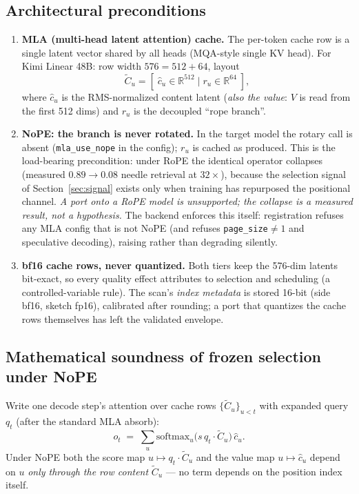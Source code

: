 \documentclass[11pt]{article}
\begin{document}
\subsection{Architectural preconditions}
\begin{enumerate}[itemsep=1pt]
\item \textbf{MLA (multi-head latent attention) cache.} The per-token cache
row is a single latent vector shared by all heads (MQA-style single KV
head). For Kimi Linear 48B: row width $576 = 512 + 64$, layout
\[
\tilde C_u = [\; \hat c_u \in \mathbb{R}^{512} \;|\; r_u \in \mathbb{R}^{64} \;],
\]
where $\hat c_u$ is the RMS-normalized content latent (\emph{also the value}:
$V$ is read from the first 512 dims) and $r_u$ is the decoupled
``rope branch''.
\item \textbf{NoPE: the branch is never rotated.} In the target model the
rotary call is absent (\texttt{mla\_use\_nope} in the config); $r_u$ is
cached as produced. This is the load-bearing precondition: under RoPE the
identical operator collapses (measured $0.89 \to 0.08$ needle retrieval at
$32\times$), because the selection signal of Section~\ref{sec:signal} exists
only when training has repurposed the positional channel. \emph{A port onto
a RoPE model is unsupported; the collapse is a measured result, not a
hypothesis.} The backend enforces this itself: registration refuses any MLA
config that is not NoPE (and refuses \texttt{page\_size}${\neq}1$ and
speculative decoding), raising rather than degrading silently.
\item \textbf{bf16 cache rows, never quantized.} Both tiers keep the
576-dim latents bit-exact, so every quality effect attributes to selection
and scheduling (a controlled-variable rule). The scan's \emph{index
metadata} is stored 16-bit (side bf16, sketch fp16), calibrated after
rounding; a port that quantizes the cache rows themselves has left the
validated envelope.
\end{enumerate}

\subsection{Mathematical soundness of frozen selection under NoPE}
\label{sec:nope-math}
Write one decode step's attention over cache rows $\{\tilde C_u\}_{u<t}$ with
expanded query $q_t$ (after the standard MLA absorb):
\[
o_t \;=\; \sum_{u} \mathrm{softmax}_u\!\big( s\, q_t \cdot \tilde C_u \big)\, \hat c_u .
\]
Under NoPE both the score map $u \mapsto q_t \cdot \tilde C_u$ and the value
map $u \mapsto \hat c_u$ depend on $u$ \emph{only through the row content}
$\tilde C_u$ --- no term depends on the position index itself.
\end{document}

